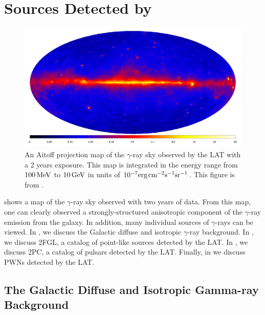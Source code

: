 
\section{Sources Detected by }

\begin{figure}[htbp]
  \centering
    \includegraphics[width=\textwidth]{chapters/introduction/figures/lat_skymap_2fgl.pdf}
  \caption{
  An Aitoff projection map of the $\gamma$-ray sky observed by the
  \ac{LAT} with a 2 years exposure.  This map is integrated in the
  energy range from $100\,\text{MeV}$ to $10\,\text{GeV}$ in units
  of $10^{-7}\text{erg}\,\text{cm}^{-2}\text{s}^{-1}\text{sr}^{-1}$.  This figure is
  from \cite{nolan_2012_fermi-large}.
  }
\end{figure}

 shows a map of the $\gamma$-ray sky observed
with two years of data. From this map, one can clearly observed a
strongly-structured anisotropic component of the $\gamma$-ray emission
from the galaxy. In addition, many individual sources of $\gamma$-rays
can be viewed. In , we
discuss the Galactic diffuse and isotropic $\gamma$-ray background. In
, we discuss \ac{2FGL}, a catalog of point-like
sources detected by the \ac{LAT}. In \subsecref{2pc}, we discuss
\ac{2PC}, a catalog of pulsars detected by the \ac{LAT}.  Finally,
in  we discuss \acp{PWN} detected by the
\ac{LAT}.


\subsection{The Galactic Diffuse and Isotropic Gamma-ray Background}

